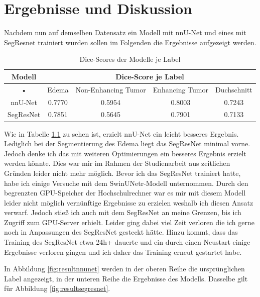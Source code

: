 \chapter{Ergebnisse und Diskussion}
Nachdem nun auf demselben Datensatz ein Modell mit nnU-Net und eines mit SegResnet trainiert wurden sollen im Folgenden die Ergebnisse aufgezeigt werden. 

\begin{table}[H]
\begin{tabular}{|c|c|c|c|c|}
\hline 
Modell & \multicolumn{4}{c|}{Dice-Score je Label} \\ 
\hline 
• & Edema & Non-Enhancing Tumor & Enhancing Tumor & Duchschnitt \\ 
\hline 
nnU-Net & 0.7770 & 0.5954 & 0.8003 & 0.7243 \\ 
\hline 
SegResNet & 0.7851 & 0.5645 & 0.7901 & 0.7133 \\ 
\hline 
\end{tabular} 
\caption{\label{tab:dice}Dice-Scores der Modelle je Label}
\end{table}

Wie in Tabelle \ref{tab:dice} zu sehen ist, erzielt nnU-Net ein leicht besseres Ergebnis. Lediglich bei der Segmentierung des Edema liegt das SegResNet minimal vorne. Jedoch denke ich das mit weiteren Optimierungen ein besseres Ergebnis erzielt werden könnte. Dies war mir im Rahmen der Studienarbeit aus zeitlichen Gründen leider nicht mehr möglich. Bevor ich das SegResNet trainiert hatte, habe ich einige Versuche mit dem SwinUNetr-Modell unternommen. Durch den begrenzten GPU-Speicher der Hochschulrechner war es mir mit diesem Modell leider nicht möglich vernünftige Ergebnisse zu erzielen weshalb ich diesen Ansatz verwarf. Jedoch stieß ich auch mit dem SegResNet an meine Grenzen, bis ich Zugriff zum GPU-Server erhielt. Leider ging dabei viel Zeit verloren die ich gerne noch in Anpassungen des SegResNet gesteckt hätte. Hinzu kommt, dass das Training des SegResNet etwa 24h+ dauerte und ein durch einen Neustart einige Ergebnisse verloren gingen und ich daher das Training erneut gestartet habe.

In Abbildung \ref{fig:resultnnunet} werden in der oberen Reihe die ursprünglichen Label angezeigt, in der unteren Reihe die Ergebnisse des Modells. Dasselbe gilt für Abbildung \ref{fig:resultsegresnet}.

